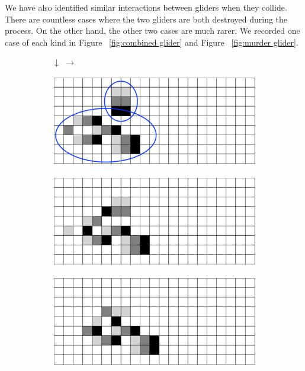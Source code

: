 \documentclass[12pt]{article}
\numberwithin{figure}{section} %
\begin{document}
We have also identified similar interactions between gliders when they collide. There are countless cases where the two gliders are both destroyed during the process. On the other hand, the other two cases are much rarer. We recorded one case of each kind in Figure ~\ref{fig:combined glider} and Figure ~\ref{fig:murder glider}. 

\begin{figure}[H]
	\begin{subfigure}[t]{0.06\textwidth}
		\centering
		{\LARGE$\downarrow{}$}
		{\LARGE$\xrightarrow{}$}
  	\end{subfigure}	
	\begin{subfigure}{0.45\textwidth}
     		\includegraphics[width=\linewidth]{Section4/35.0}
     		\subcaption{}
   	\end{subfigure}
    	\begin{subfigure}{0.45\textwidth}
     		\includegraphics[width=\linewidth]{Section4/35.1}
     		\subcaption{}
   	\end{subfigure}
	\newline
	\begin{subfigure}[t]{0.06\textwidth}
		\centering
		\phantom{H}
  	\end{subfigure}	
	\begin{subfigure}{0.45\textwidth}
     		\includegraphics[width=\linewidth]{Section4/35.2}

\end{subfigure}
\end{figure}
\end{document}
